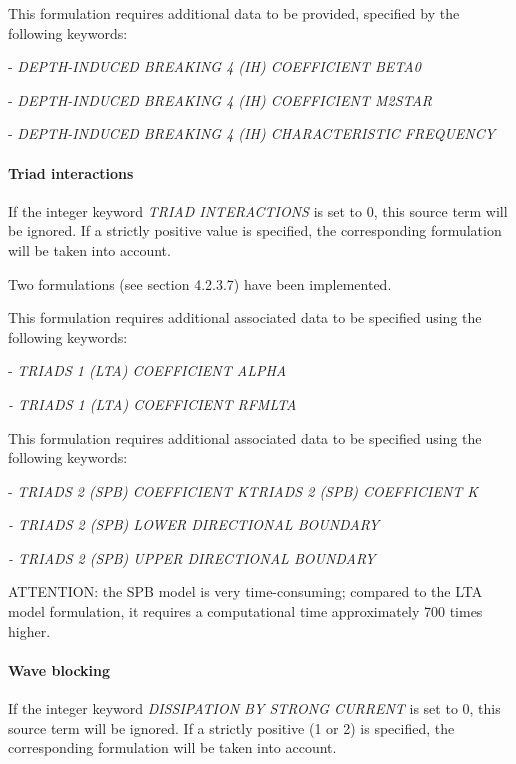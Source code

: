  This formulation requires additional data to be provided, specified by the following keywords:

 - \textit{DEPTH-INDUCED BREAKING 4 (IH) COEFFICIENT BETA0}

 - \textit{DEPTH-INDUCED BREAKING 4 (IH) COEFFICIENT M2STAR}

 - \textit{DEPTH-INDUCED BREAKING 4 (IH) CHARACTERISTIC FREQUENCY}

\paragraph{ Triad interactions}

If the integer keyword \textit{TRIAD INTERACTIONS} is set to 0, this source term will be ignored. If a strictly positive value is
specified, the corresponding formulation will be taken into account.

 Two formulations (see section 4.2.3.7) have been implemented.

 \textbf{}

 This formulation requires additional associated data to be specified using the following keywords:

 - \textit{TRIADS 1 (LTA) COEFFICIENT ALPHA }

 \textit{- TRIADS 1 (LTA) COEFFICIENT RFMLTA }

 \textbf{}

 \textbf{}

 This formulation requires additional associated data to be specified using the following keywords:

 - \textit{TRIADS 2 (SPB) COEFFICIENT KTRIADS 2 (SPB) COEFFICIENT K}

 \textit{- TRIADS 2 (SPB) LOWER DIRECTIONAL BOUNDARY}

 \textit{- TRIADS 2 (SPB) UPPER DIRECTIONAL BOUNDARY}

 ATTENTION: the SPB model is very time-consuming; compared to the LTA model formulation, it requires a computational time approximately 700 times higher.


\paragraph{ Wave blocking }

 If the integer keyword \textit{DISSIPATION BY STRONG CURRENT} is set to 0, this source term will be ignored. If a strictly positive (1 or 2) is specified, the corresponding formulation will be taken into account.


